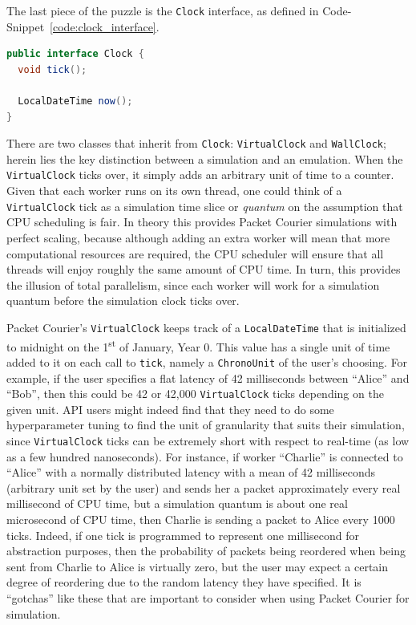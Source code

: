 The last piece of the puzzle is the \texttt{Clock} interface, as defined in Code-Snippet~\ref{code:clock_interface}.

\begin{lstlisting}[language=Java,caption={The \texttt{Clock} interface exactly as it appears in the codebase.},
    label={code:clock_interface},captionpos=b]
public interface Clock {
  void tick();

  LocalDateTime now();
}
\end{lstlisting}

There are two classes that inherit from \texttt{Clock}: \texttt{VirtualClock} and \texttt{WallClock}; herein lies the
key distinction between a simulation and an emulation. When the \texttt{VirtualClock} ticks over, it simply adds an
arbitrary unit of time to a counter. Given that each worker runs on its own thread, one could think of a
\texttt{VirtualClock} tick as a simulation time slice or \emph{quantum}\cite{cpu_time_slicing} on the assumption that
CPU scheduling is fair. In theory this provides Packet Courier simulations with perfect scaling, because although
adding an extra worker will mean that more computational resources are required, the CPU scheduler will ensure that
all threads will enjoy roughly the same amount of CPU time. In turn, this provides the illusion of total parallelism,
since each worker will work for a simulation quantum before the simulation clock ticks over.

Packet Courier's \texttt{VirtualClock} keeps track of a \texttt{LocalDateTime}\cite{java_LocalDateTime} that is
initialized to midnight on the 1\textsuperscript{st} of January, Year 0. This value has a single unit of time added
to it on each call to \texttt{tick}, namely a \texttt{ChronoUnit}\cite{java_ChronoUnit} of the user's choosing. For
example, if the user specifies a flat latency of 42 milliseconds between ``Alice'' and ``Bob'', then this could be 42
or 42,000 \texttt{VirtualClock} ticks depending on the given unit. API users might indeed find that they need to do
some hyperparameter tuning to find the unit of granularity that suits their simulation, since \texttt{VirtualClock}
ticks can be extremely short with respect to real-time (as low as a few hundred nanoseconds). For instance, if worker
``Charlie'' is connected to ``Alice'' with a normally distributed latency with a mean of 42 milliseconds (arbitrary
unit set by the user) and sends her a packet approximately every real millisecond of CPU time, but a simulation
quantum is about one real microsecond of CPU time, then Charlie is sending a packet to Alice every 1000 ticks.
Indeed, if one tick is programmed to represent one millisecond for abstraction purposes, then the probability of
packets being reordered when being sent from Charlie to Alice is virtually zero, but the user may expect a certain
degree of reordering due to the random latency they have specified. It is ``gotchas'' like these that are important
to consider when using Packet Courier for simulation.

